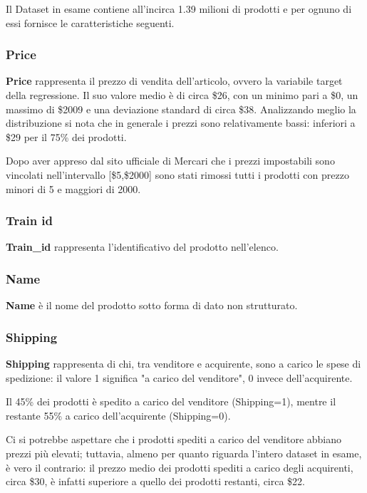
Il Dataset in esame contiene all'incirca 1.39 milioni di prodotti e per ognuno
di essi fornisce le caratteristiche seguenti.
\subsubsection{Price}
\textbf{Price} rappresenta il prezzo di vendita dell'articolo, ovvero la
variabile target della regressione. Il suo valore medio è di circa \$26, con un
minimo pari a \$0, un massimo di \$2009 e una deviazione standard di circa \$38.
Analizzando meglio la distribuzione si nota che in generale i prezzi sono
relativamente bassi: inferiori a \$29 per il 75\% dei prodotti.

Dopo aver appreso dal sito ufficiale di Mercari che i prezzi impostabili sono
vincolati nell'intervallo [\$5,\$2000] sono stati rimossi tutti i prodotti con prezzo minori di 5 e maggiori di 2000.
\subsubsection{Train id}
\textbf{Train\_id} rappresenta l'identificativo del prodotto nell'elenco.
\subsubsection{Name}
\textbf{Name} è il nome del prodotto sotto forma di dato non strutturato.
\subsubsection{Shipping}
\textbf{Shipping} rappresenta di chi, tra venditore e acquirente, sono a carico
le spese di spedizione: il valore 1 significa "a carico del
venditore", 0 invece dell'acquirente.

Il 45\% dei prodotti è spedito a carico del venditore (Shipping=1), mentre il
restante 55\% a carico dell'acquirente (Shipping=0).

Ci si potrebbe aspettare che i prodotti spediti a carico del venditore abbiano
prezzi più elevati; tuttavia, almeno per quanto riguarda l'intero dataset in
esame, è vero il contrario: il prezzo medio dei prodotti spediti a carico degli
acquirenti, circa \$30, è infatti superiore a quello dei prodotti restanti,
circa \$22.

